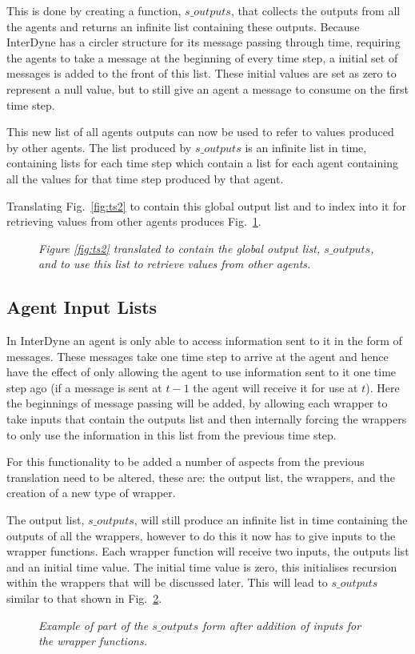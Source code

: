 \documentclass{article}
\begin{document}
This is done by creating a function, $s\_outputs$, that collects the outputs from all the agents and returns an infinite list containing these outputs. Because InterDyne has a circler structure for its message passing through time, requiring the agents to take a message at the beginning of every time step, a initial set of messages is added to the front of this list. These initial values are set as zero to represent a null value, but to still give an agent a message to consume on the first time step. 

This new list of all agents outputs can now be used to refer to values produced by other agents. The list produced by $s\_outputs$ is an infinite list in time,  containing lists for each time step which contain a list for each agent containing all the values for that time step produced by that agent. 

Translating Fig.~\ref{fig:ts2} to contain this global output list and to index into it for retrieving values from other agents produces Fig.~\ref{fig:ts3}.
\begin{figure}[H]
	\centering
	
	\caption{\it  Figure \ref{fig:ts2} translated to contain the global output list, $s\_outputs$, and to use this list to retrieve values from other agents.}
	\label{fig:ts3}
\end{figure} 


\subsection{Agent Input Lists}
In InterDyne an agent is only able to access information sent to it in the form of messages. These messages take one time step to arrive at the agent and hence have the effect of only allowing the agent to use information sent to it one time step ago (if a message is sent at $t-1$ the agent will receive it for use at $t$). Here the beginnings of message passing will be added, by allowing each wrapper to take inputs that contain the outputs list and then internally forcing the wrappers to only use the information in this list from the previous time step. 

For this functionality to be added a number of aspects from the previous translation need to be altered, these are: the output list, the wrappers, and the creation of a new type of wrapper.  

The output list, $s\_outputs$, will still produce an infinite list in time containing the outputs of all the wrappers, however to do this it now has to give inputs to the wrapper functions. Each wrapper function will receive two inputs, the outputs list and an initial time value. The initial time value is zero, this initialises recursion within the wrappers that will be discussed later.  This will lead to $s\_outputs$ similar to that shown in Fig.~\ref{fig:souts4}.
\begin{figure}[H]
	\centering
	
	\caption{\it Example of part of the $s\_outputs$ form after addition of inputs for the wrapper functions.}
	\label{fig:souts4}
\end{figure} 
\end{document}

